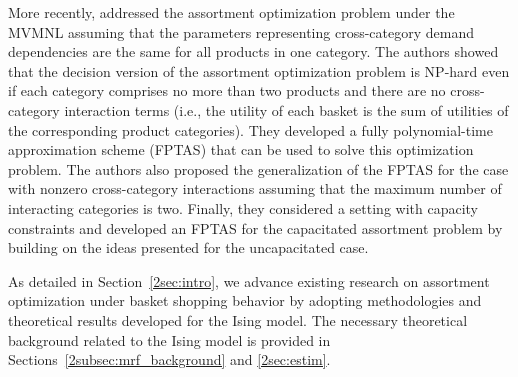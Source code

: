 More recently, \cite{Jasin1} addressed the assortment optimization problem under the MVMNL assuming that the parameters representing cross-category demand dependencies are the same for all products in one category. The authors showed that 
 the decision version of the assortment optimization problem is NP-hard even if each category comprises no more than two products and there are no cross-category interaction terms (i.e., the utility of each basket is the sum of utilities of the corresponding product categories). They developed a fully polynomial-time approximation scheme (FPTAS) that can be used to solve this optimization problem. The authors also proposed the generalization of the FPTAS for the case with nonzero cross-category interactions assuming that the maximum number of interacting categories is two. Finally, they considered a setting with capacity constraints and developed an FPTAS for the capacitated assortment problem by building on the ideas presented for the uncapacitated case. 




As detailed in Section~\ref{2sec:intro}, we advance existing research on assortment optimization under basket shopping behavior by adopting methodologies and theoretical results developed for the Ising model. The necessary theoretical background related to the Ising model is provided in Sections~\ref{2subsec:mrf_background} and \ref{2sec:estim}.



\vspace{-0.04cm}